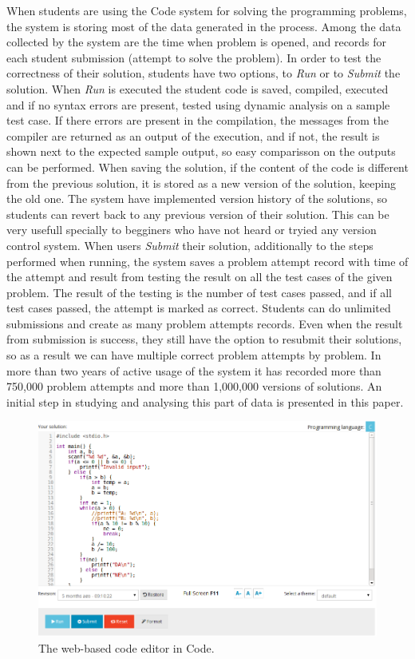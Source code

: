 \documentclass{llncs}
\begin{document}
When students are using the Code system for solving the programming problems,
the system is storing most of the data generated in the process. Among the
data collected by the system are the time when problem is
opened, and records for each student submission (attempt to solve the problem).
In order to test the correctness of their solution, students have two
options, to \emph{Run} or to \emph{Submit} the solution. When \emph{Run} is
executed the student code is saved, compiled, executed and if no syntax
errors are present, tested using dynamic analysis on a sample test case. If
there errors are present in the compilation, the messages from the
compiler are returned as an output of the execution, and if not, the result
is shown next to the expected sample output, so easy comparisson on the outputs can be performed.
When saving the solution, if the content of the code is different from the
previous solution, it is stored as a new version of the solution, keeping the
old one. The system have implemented version history of the solutions, so
students can revert back to any previous version of their solution. This can be
very usefull specially to begginers who have not heard or tryied any version control system.
When users \emph{Submit} their solution, additionally to the steps performed
when running, the system saves a problem attempt record with time of the attempt
and result from testing the result on all the test cases of the given problem. The
result of the testing is the number of test cases passed, and if all test cases
passed, the attempt is marked as correct. Students can do unlimited
submissions and create as many problem attempts records. Even when the result from
submission is success, they still have the option to resubmit their solutions,
so as a result we can have multiple correct problem attempts by problem. In more
than two years of active usage of the system it has recorded more than 750,000
problem attempts and more than 1,000,000 versions of solutions.
An initial step in studying and analysing this part of data is presented in this
paper.


\begin{figure}
\centering
\includegraphics[width=.99\textwidth]{code_usage/editor}
\caption{The web-based code editor in Code.}
\label{fig:code_editor}
\end{figure}
\end{document}
